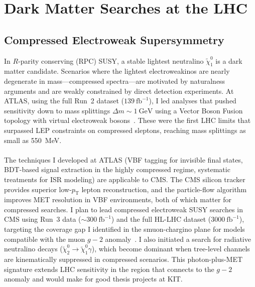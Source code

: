 \documentclass[10pt,a4paper,sans]{moderncv} %
\begin{document}
\section{Dark Matter Searches at the LHC}

\subsection{Compressed Electroweak Supersymmetry}
In $R$-parity conserving (RPC) SUSY, a stable lightest neutralino $\tilde{\chi}_1^0$ is a dark matter candidate. Scenarios where the lightest electroweakinos are nearly degenerate in mass---compressed spectra---are motivated by naturalness arguments and are weakly constrained by direct detection experiments. At ATLAS, using the full Run~2 dataset ($139\ \mathrm{fb}^{-1}$), I led analyses that pushed sensitivity down to mass splittings $\Delta m \sim 1\ \mathrm{GeV}$ using a Vector Boson Fusion topology with virtual electroweak bosons~\cite{ATLAS:2019lng}. These were the first LHC limits that surpassed LEP constraints on compressed sleptons, reaching mass splittings as small as 550~MeV.
\\
\\
The techniques I developed at ATLAS (VBF tagging for invisible final states, BDT-based signal extraction in the highly compressed regime, systematic treatments for ISR modeling) are applicable to CMS. The CMS silicon tracker provides superior low-$p_\mathrm{T}$ lepton reconstruction, and the particle-flow algorithm improves MET resolution in VBF environments, both of which matter for compressed searches. I plan to lead compressed electroweak SUSY searches in CMS using Run~3 data ($\sim 300\ \mathrm{fb}^{-1}$) and the full HL-LHC dataset ($3000\ \mathrm{fb}^{-1}$), targeting the coverage gap I identified in the smuon-chargino plane for models compatible with the muon $g-2$ anomaly~\cite{Chakraborti:2021dli}. I also initiated a search for radiative neutralino decays ($\tilde{\chi}_2^0 \to \tilde{\chi}_1^0 \gamma$), which become dominant when tree-level channels are kinematically suppressed in compressed scenarios. This photon-plus-MET signature extends LHC sensitivity in the region that connects to the $g-2$ anomaly and would make for good thesis projects at KIT.
\end{document}
